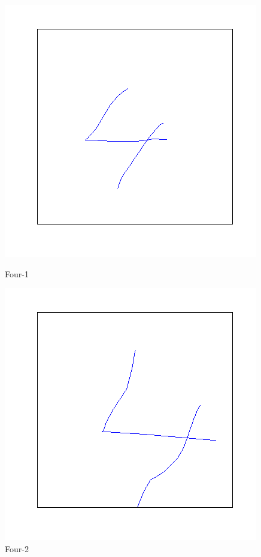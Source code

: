 \documentclass[a4paper, 10pt]{article}
\begin{document}
\begin{figure}[ht]
\begin{minipage}[b]{0.45\linewidth}
\centering
\includegraphics[width=\textwidth]{figs/4-1}
\caption{Four-1}
\label{fig:figure1}
\end{minipage}
\hspace{0.5cm}
\begin{minipage}[b]{0.45\linewidth}
\centering
\includegraphics[width=\textwidth]{figs/4-2}
\caption{Four-2}
\label{fig:figure2}
\end{minipage}
\end{figure}
\end{document}
